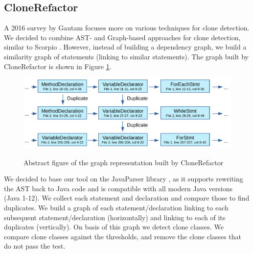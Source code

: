 \documentclass[a4paper]{article}
\begin{document}
\subsection{CloneRefactor}
A 2016 survey by Gautam \cite{gautam2016various} focuses more on various techniques for clone detection. We decided to combine AST- and Graph-based approaches for clone detection, similar to Scorpio \cite{higo2013revisiting, kamalpriya2017enhancing}. However, instead of building a dependency graph, we build a similarity graph of statements (linking to similar statements). The graph built by CloneRefactor is shown in Figure \ref{fig:clonerefactor}.

\begin{figure}[H]
  \caption{Abstract figure of the graph representation built by CloneRefactor}
  \medskip
  \includegraphics[width=1\columnwidth]{img/CodeGraph}
  \label{fig:clonerefactor}
\end{figure}

We decided to base our tool on the JavaParser library \cite{tomassetti2017javaparser}, as it supports rewriting the AST back to Java code and is compatible with all modern Java versions (Java 1-12). We collect each statement and declaration and compare those to find duplicates. We build a graph of each statement/declaration linking to each subsequent statement/declaration (horizontally) and linking to each of its duplicates (vertically). On basis of this graph we detect clone classes. We compare clone classes against the thresholds, and remove the clone classes that do not pass the test.
\end{document}
